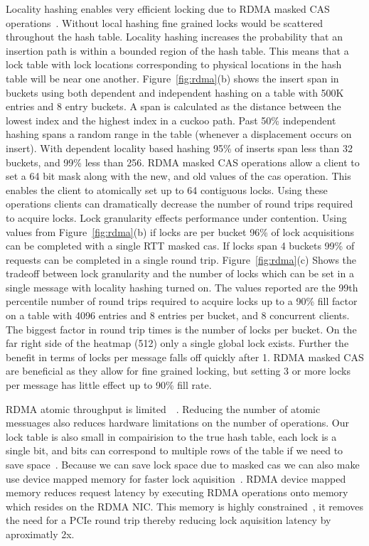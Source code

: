 Locality hashing enables very efficient locking due to RDMA
masked CAS
operations~\cite{advanced-transport,scalable-locks}. Without
local hashing fine grained locks would be scattered
throughout the hash table. Locality hashing increases the
probability that an insertion path is within a bounded
region of the hash table.  This means that a lock table with
lock locations corresponding to physical locations in the
hash table will be near one another.  
Figure~\ref{fig:rdma}(b) shows the insert span in buckets
using both dependent and independent hashing on a table with
500K entries and 8 entry buckets. A span is calculated as
the distance between the lowest index and the highest index
in a cuckoo path. Past 50\% independent hashing spans a
random range in the table (whenever a displacement occurs on
insert). With dependent locality based hashing 95\% of
inserts span less than 32 buckets, and 99\% less than 256.
RDMA masked CAS operations allow a client to set a 64 bit
mask along with the new, and old values of the cas
operation. This enables the client to atomically set up to
64 contiguous locks. Using these operations clients can
dramatically decrease the number of round trips required to
acquire locks.
Lock granularity effects performance under contention. Using
values from Figure~\ref{fig:rdma}(b) if locks are per bucket
96\% of lock acquisitions can be completed with a single RTT
masked cas. If locks span 4 buckets 99\% of requests can be
completed in a single round trip.
Figure~\ref{fig:rdma}(c) Shows the tradeoff between lock
granularity and the number of locks which can be set in a
single message with locality hashing turned on. The values
reported are the 99th percentile number of round trips
required to acquire locks up to a 90\% fill factor on a
table with 4096 entries and 8 entries per bucket, and 8
concurrent clients. The biggest factor in round trip times
is the number of locks per bucket. On the far right side of
the heatmap (512) only a single global lock exists. Further
the benefit in terms of locks per message falls off quickly
after 1. RDMA masked CAS are beneficial as they allow for
fine grained locking, but setting 3 or more locks per
message has little effect up to 90\% fill rate.

RDMA atomic throughput is
limited~\cite{design-guidelines}~\todo{[swordbox]}. Reducing
the number of atomic messuages also reduces hardware
limitations on the number of operations. Our lock table is
also small in compairision to the true hash table, each lock
is a single bit, and bits can correspond to multiple rows of
the table if we need to save space~. Because we can save lock space due to
masked cas we can also make use device mapped memory for
faster lock aquisition~\cite{sherman}. RDMA device mapped
memory reduces request latency by executing RDMA operations
onto memory which resides on the RDMA NIC. This memory is
highly constrained~, it removes the need
for a PCIe round trip thereby reducing lock aquisition
latency by aproximatly 2x.


